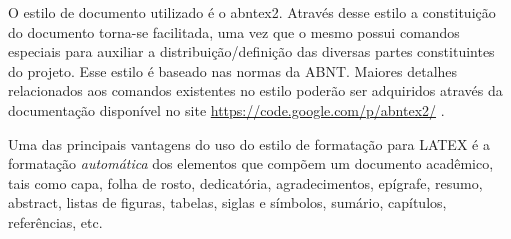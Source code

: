 O estilo de documento utilizado é o {\ttfamily abntex2}.
Através desse estilo a constituição do documento torna-se facilitada, uma vez que o mesmo possui comandos especiais para auxiliar a distribuição/definição das diversas partes constituintes do projeto.
Esse estilo é baseado nas normas da ABNT.
Maiores detalhes relacionados aos comandos existentes no estilo poderão ser adquiridos através da documentação disponível no site \href{https://code.google.com/p/abntex2/}{https://code.google.com/p/abntex2/} \cite{abntex2classe}.

Uma das principais vantagens do uso do estilo de formatação para LATEX é a formatação \textit{automática} dos elementos que compõem um documento acadêmico, tais como capa, folha de rosto, dedicatória, agradecimentos, epígrafe, resumo, abstract, listas de figuras, tabelas, siglas e símbolos, sumário, capítulos, referências, etc.






